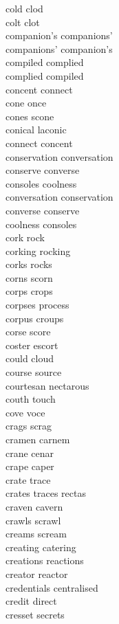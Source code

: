 cold clod\\
colt clot\\
companion's companions'\\
companions' companion's\\
compiled complied\\
complied compiled\\
concent connect\\
cone once\\
cones scone\\
conical laconic\\
connect concent\\
conservation conversation\\
conserve converse\\
consoles coolness\\
conversation conservation\\
converse conserve\\
coolness consoles\\
cork rock\\
corking rocking\\
corks rocks\\
corns scorn\\
corps crops\\
corpses process\\
corpus croups\\
corse score\\
coster escort\\
could cloud\\
course source\\
courtesan nectarous\\
couth touch\\
cove voce\\
crags scrag\\
cramen carnem\\
crane cenar\\
crape caper\\
crate trace\\
crates traces rectas\\
craven cavern\\
crawls scrawl\\
creams scream\\
creating catering\\
creations reactions\\
creator reactor\\
credentials centralised\\
credit direct\\
cresset secrets\\
